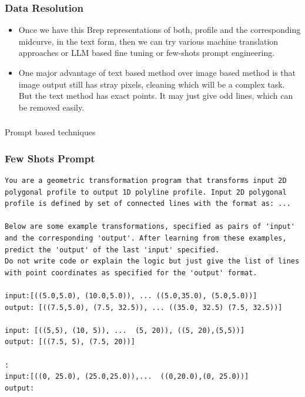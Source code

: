 \begin{frame}[fragile]\frametitle{Data Resolution}

\begin{itemize}
\item Once we have this Brep representations of both, profile and the corresponding midcurve, in the text form, then we can try various machine translation approaches or LLM based fine tuning or few-shots prompt engineering.
\item One major advantage of text based method over image based method is that image output still has stray pixels, cleaning which will be a complex task. But the text method has exact points. It may just give odd lines, which can be removed easily.
\end{itemize}	


\end{frame}

\begin{frame}[fragile]\frametitle{}
\begin{center}
{\Large Prompt based techniques}
\end{center}
\end{frame}


\begin{frame}[fragile]\frametitle{Few Shots Prompt}
\begin{lstlisting}
You are a geometric transformation program that transforms input 2D polygonal profile to output 1D polyline profile. Input 2D polygonal profile is defined by set of connected lines with the format as: ...

Below are some example transformations, specified as pairs of 'input' and the corresponding 'output'. After learning from these examples, predict the 'output' of the last 'input' specified.
Do not write code or explain the logic but just give the list of lines with point coordinates as specified for the 'output' format.

input:[((5.0,5.0), (10.0,5.0)), ... ((5.0,35.0), (5.0,5.0))]
output: [((7.5,5.0), (7.5, 32.5)), ... ((35.0, 32.5) (7.5, 32.5))]

input: [((5,5), (10, 5)), ...  (5, 20)), ((5, 20),(5,5))]
output: [((7.5, 5), (7.5, 20))]

:
input:[((0, 25.0), (25.0,25.0)),...  ((0,20.0),(0, 25.0))]
output:
\end{lstlisting}	
\end{frame}

